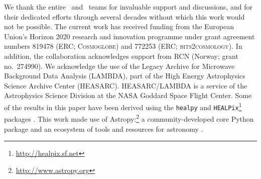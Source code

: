 \begin{acknowledgements}
  We thank the entire \Planck\ and \WMAP\ teams for
  invaluable support and discussions, and for their dedicated efforts
  through several decades without which this work would not be
  possible. The current work has received funding from the European
  Union’s Horizon 2020 research and innovation programme under grant
  agreement numbers 819478 (ERC; \textsc{Cosmoglobe}) and 772253 (ERC;
  \textsc{bits2cosmology}).
  In
  addition, the collaboration acknowledges support from
  RCN (Norway; grant no.\ 274990).
  We acknowledge the use of the Legacy Archive for Microwave Background Data
  Analysis (LAMBDA), part of the High Energy Astrophysics Science Archive Center
  (HEASARC). HEASARC/LAMBDA is a service of the Astrophysics Science Division at
  the NASA Goddard Space Flight Center.  
  Some of the results in this paper have been derived using the \texttt{healpy}
  and \texttt{HEALPix}\footnote{\url{http://healpix.sf.net}} packages
  \citep{gorski2005, Zonca2019}.  This work made use of
  Astropy:\footnote{\url{http://www.astropy.org}} a community-developed
  core Python package and an ecosystem of tools and resources for
  astronomy \citep{astropy:2013, astropy:2018, astropy:2022}.
\end{acknowledgements}
